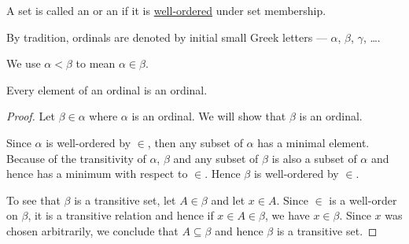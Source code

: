 \medskip

\begin{definition}\label{def:ordinal}
  A set is called an  or an  if it is \hyperref[def:well_ordered_set]{well-ordered} under set membership.

  By tradition, ordinals are denoted by initial small Greek letters --- \( \alpha \), \( \beta \), \( \gamma \), \ldots.

  We use \( \alpha < \beta \) to mean \( \alpha \in \beta \).
\end{definition}

\begin{proposition}\label{thm:element_of_ordinal_is_ordinal}
   Every element of an ordinal is an ordinal.
\end{proposition}
\begin{proof}
  Let \( \beta \in \alpha \) where \( \alpha \) is an ordinal. We will show that \( \beta \) is an ordinal.

  Since \( \alpha \) is well-ordered by \( \in \), then any subset of \( \alpha \) has a minimal element. Because of the transitivity of \( \alpha \), \( \beta \) and any subset of \( \beta \) is also a subset of \( \alpha \) and hence has a minimum with respect to \( \in \). Hence \( \beta \) is well-ordered by \( \in \).

  To see that \( \beta \) is a transitive set, let \( A \in \beta \) and let \( x \in A \). Since \( \in \) is a well-order on \( \beta \), it is a transitive relation and hence if \( x \in A \in \beta \), we have \( x \in \beta \). Since \( x \) was chosen arbitrarily, we conclude that \( A \subseteq \beta \) and hence \( \beta \) is a transitive set.
\end{proof}


